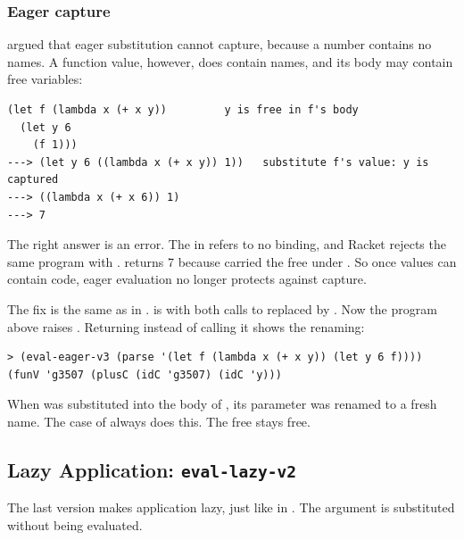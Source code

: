 \subsubsection{Eager capture}  argued that eager substitution cannot capture, because a number contains no names. A function value, however, does contain names, and its body may contain free variables:
\begin{lstlisting}[style=repl]
(let f (lambda x (+ x y))         y is free in f's body
  (let y 6
    (f 1)))
---> (let y 6 ((lambda x (+ x y)) 1))   substitute f's value: y is captured
---> ((lambda x (+ x 6)) 1)
---> 7
\end{lstlisting}
The right answer is an error. The  in  refers to no binding, and Racket rejects the same program with .  returns 7 because  carried the free  under . So once values can contain code, eager evaluation no longer protects against capture.

The fix is the same as in .  is  with both calls to  replaced by . Now the program above raises . Returning  instead of calling it shows the renaming:
\begin{lstlisting}[style=repl]
> (eval-eager-v3 (parse '(let f (lambda x (+ x y)) (let y 6 f))))
(funV 'g3507 (plusC (idC 'g3507) (idC 'y)))
\end{lstlisting}
When  was substituted into the body of , its parameter was renamed to a fresh name. The  case of  always does this. The free  stays free.

\subsection{Lazy Application: \texttt{eval-lazy-v2}}

The last version makes application lazy, just like  in . The argument is substituted without being evaluated.

